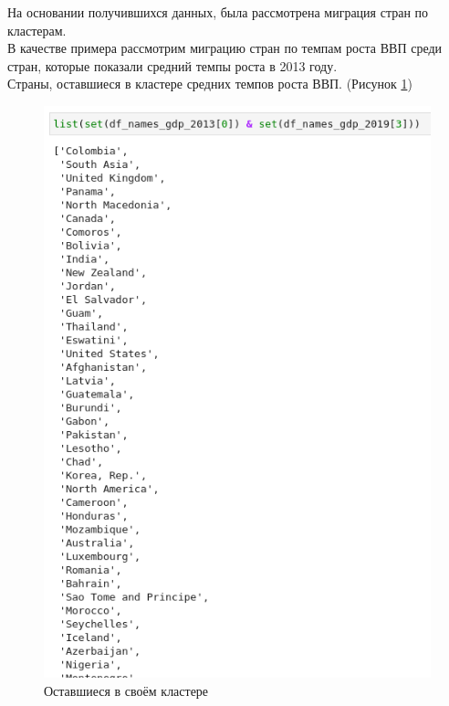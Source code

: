 \documentclass[14pt,fleqn]{extarticle}
\begin{document}
	\newpage
	
	На основании получившихся данных, была рассмотрена миграция стран по кластерам.\\
	
	В качестве примера рассмотрим миграцию стран по темпам роста ВВП среди стран, которые показали средний темпы роста в 2013 году.\\
	
	Страны, оставшиеся в кластере средних темпов роста ВВП. (Рисунок \ref{fig:cluster_mean_mean})
	
	\begin{figure}[h]
		\centering \includegraphics[scale=0.5]{cluster_mean_mean}
		\caption{Оставшиеся в своём кластере}
		\label{fig:cluster_mean_mean}
	\end{figure}

	\newpage
\end{document}
